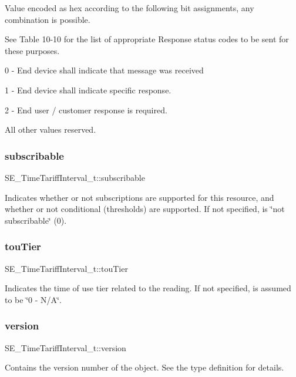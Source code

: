 Value encoded as hex according to the following bit assignments, any combination is possible.

See Table 10-\/10 for the list of appropriate Response status codes to be sent for these purposes.

0 -\/ End device shall indicate that message was received

1 -\/ End device shall indicate specific response.

2 -\/ End user / customer response is required.

All other values reserved. \mbox{\label{group__TimeTariffInterval_ga204d201f3d7f068145fe48b0cf6fef15}} 
\subsubsection{\texorpdfstring{subscribable}{subscribable}}
{\footnotesize\ttfamily S\+E\+\_\+\+Time\+Tariff\+Interval\+\_\+t\+::subscribable}

Indicates whether or not subscriptions are supported for this resource, and whether or not conditional (thresholds) are supported. If not specified, is \char`\"{}not subscribable\char`\"{} (0). \mbox{\label{group__TimeTariffInterval_gae1b2230df627613ae18186df2fc8f21d}} 
\subsubsection{\texorpdfstring{tou\+Tier}{touTier}}
{\footnotesize\ttfamily S\+E\+\_\+\+Time\+Tariff\+Interval\+\_\+t\+::tou\+Tier}

Indicates the time of use tier related to the reading. If not specified, is assumed to be \char`\"{}0 -\/ N/\+A\char`\"{}. \mbox{\label{group__TimeTariffInterval_ga1dcb279f5b9a99f365184999dcf4183f}} 
\subsubsection{\texorpdfstring{version}{version}}
{\footnotesize\ttfamily S\+E\+\_\+\+Time\+Tariff\+Interval\+\_\+t\+::version}

Contains the version number of the object. See the type definition for details. 